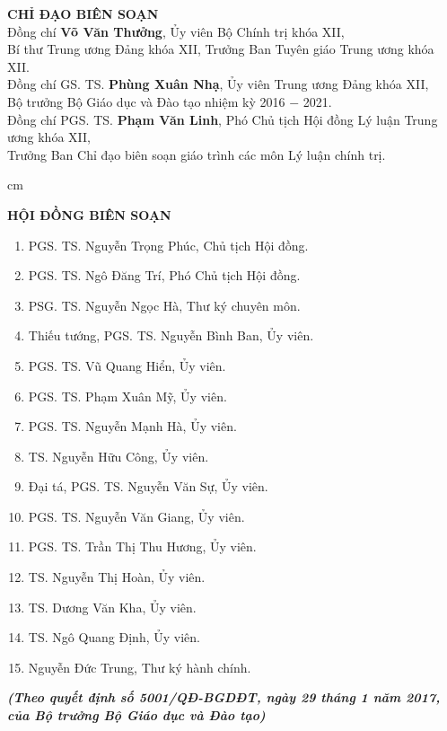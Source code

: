 \begin{center}
\textbf{CHỈ ĐẠO BIÊN SOẠN}\\
Đồng chí \textbf{Võ Văn Thưởng}, Ủy viên Bộ Chính trị khóa XII,\\
Bí thư Trung ương Đảng khóa XII, Trưởng Ban Tuyên giáo Trung ương khóa XII.\\
Đồng chí GS. TS. \textbf{Phùng Xuân Nhạ}, Ủy viên Trung ương Đảng khóa XII,\\
Bộ trưởng Bộ Giáo dục và Đào tạo nhiệm kỳ 2016 $-$ 2021.\\
Đồng chí PGS. TS. \textbf{Phạm Văn Linh}, Phó Chủ tịch Hội đồng Lý luận Trung ương khóa XII,\\
Trưởng Ban Chỉ đạo biên soạn giáo trình các môn Lý luận chính trị.
\end{center}

 cm
\begin{center}
\textbf{HỘI ĐỒNG BIÊN SOẠN}
\end{center}

\begin{enumerate}
\item PGS. TS. Nguyễn Trọng Phúc, Chủ tịch Hội đồng.
\item PGS. TS. Ngô Đăng Trí, Phó Chủ tịch Hội đồng.
\item PSG. TS. Nguyễn Ngọc Hà, Thư ký chuyên môn.
\item Thiếu tướng, PGS. TS. Nguyễn Bình Ban, Ủy viên.
\item PGS. TS. Vũ Quang Hiển, Ủy viên.
\item PGS. TS. Phạm Xuân Mỹ, Ủy viên.
\item PGS. TS. Nguyễn Mạnh Hà, Ủy viên.
\item TS. Nguyễn Hữu Công, Ủy viên.
\item Đại tá, PGS. TS. Nguyễn Văn Sự, Ủy viên.
\item PGS. TS. Nguyễn Văn Giang, Ủy viên.
\item PGS. TS. Trần Thị Thu Hương, Ủy viên.
\item TS. Nguyễn Thị Hoàn, Ủy viên.
\item TS. Dương Văn Kha, Ủy viên.
\item TS. Ngô Quang Định, Ủy viên.
\item Nguyễn Đức Trung, Thư ký hành chính.
\end{enumerate}

\begin{center}
\textbf{\textit{(Theo quyết định số 5001/QĐ-BGDĐT, ngày 29 tháng 1 năm 2017, của Bộ trưởng Bộ Giáo dục và Đào tạo)}}
\end{center}